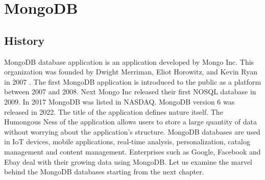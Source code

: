 \documentclass[a4Paper,12pt]{report}
\begin{document}
\chapter{MongoDB}
\section{History}
MongoDB database application is an application developed by Mongo Inc. This organization was founded by Dwight Merriman, Eliot Horowitz, and Kevin Ryan in 2007 \cite{Plugge2010-ie}. The first MongoDB application is introduced to the public as a platform between 2007 and 2008. Next Mongo Inc released their first NOSQL database in 2009. In 2017 MongoDB was listed in NASDAQ. MongoDB version 6 was released in 2022. The title of the application defines nature itself. The Humongous Ness of the application allows users to store a large quantity of data without worrying about the application's structure. MongoDB databases are used in IoT devices, mobile applications, real-time analysis, personalization, catalog management and content management. Enterprises such as Google, Facebook and Ebay deal with their growing data using MongoDB. Let us examine the marvel behind the MongoDB databases starting from the next chapter.
\end{document}
